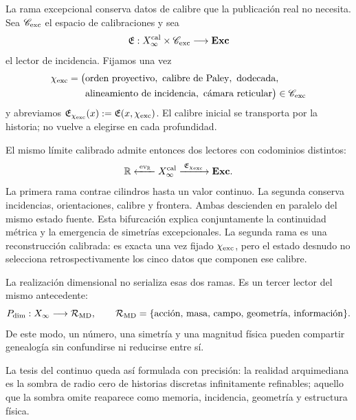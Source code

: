 {La rama excepcional conserva datos de calibre que la publicación real no
necesita. Sea \(\mathscr C_{\rm exc}\) el espacio de calibraciones y sea
\begin{equation}
\mathfrak E:
X_\infty^{\rm cal}\times\mathscr C_{\rm exc}
\longrightarrow\mathbf{Exc}
\label{p12-83-c3-s1:eq:exceptional-calibrated-reader}
\end{equation}
el lector de incidencia. Fijamos una vez
\begin{equation}
\begin{aligned}
\chi_{\rm exc}=\bigl(&\text{orden proyectivo},\ \text{calibre de Paley},
 \ \text{dodecada},\\
 &\text{alineamiento de incidencia},\ \text{cámara reticular}\bigr)
 \in\mathscr C_{\rm exc}
\end{aligned}
\label{p12-83-c3-s1:eq:exceptional-calibration}
\end{equation}
y abreviamos
\(\mathfrak E_{\chi_{\rm exc}}(x):=\mathfrak E(x,\chi_{\rm exc})\).
El calibre inicial se transporta por la historia; no vuelve a elegirse en
cada profundidad.

El mismo límite calibrado admite entonces dos lectores con codominios
distintos:
\begin{equation}
\mathbb R
\xleftarrow{\;\operatorname{ev}_{\mathbb R}\;}
X_\infty^{\rm cal}
\xrightarrow{\;\mathfrak E_{\chi_{\rm exc}}\;}
\mathbf{Exc}.
\label{p12-83-c3-s1:eq:double-projection}
\end{equation}
La primera rama contrae cilindros hasta un valor continuo. La segunda
conserva incidencias, orientaciones, calibre y frontera. Ambas descienden en
paralelo del mismo estado fuente. Esta bifurcación explica conjuntamente la
continuidad métrica y la emergencia de simetrías excepcionales. La segunda
rama es una reconstrucción calibrada: es exacta una vez fijado
\(\chi_{\rm exc}\), pero el estado desnudo no selecciona retrospectivamente
los cinco datos que componen ese calibre.

La realización dimensional no serializa esas dos ramas. Es un tercer lector
del mismo antecedente:
\begin{equation}
P_{\rm dim}:X_\infty\longrightarrow
\mathcal R_{\rm MD},
\qquad
\mathcal R_{\rm MD}=
\{\text{acción, masa, campo, geometría, información}\}.
\label{p12-83-c3-s1:eq:dimensional-publication}
\end{equation}
De este modo, un número, una simetría y una magnitud física pueden compartir
genealogía sin confundirse ni reducirse entre sí.

La tesis del continuo queda así formulada con precisión: la realidad
arquimediana es la sombra de radio cero de historias discretas infinitamente
refinables; aquello que la sombra omite reaparece como memoria, incidencia,
geometría y estructura física.

\begin{HMTScientificOwnerSubordinated}

\end{HMTScientificOwnerSubordinated}
}
